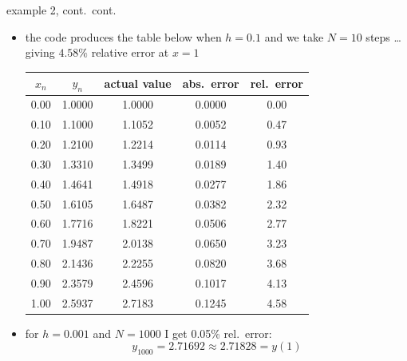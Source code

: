 \documentclass{beamer}
\begin{document}
\begin{frame}{example 2, cont.~cont.}

\begin{itemize}
\item the code produces the table below when $h=0.1$ and we take $N=10$ steps \dots giving $4.58\%$ relative error at $x=1$

\medskip
\footnotesize
\begin{tabular}{ccccc}
$x_n$ & $y_n$ & actual value & abs.~error & rel.~error \\ \hline
0.00 & 1.0000 & 1.0000 & 0.0000 & 0.00 \\
0.10 & 1.1000 & 1.1052 & 0.0052 & 0.47 \\
0.20 & 1.2100 & 1.2214 & 0.0114 & 0.93 \\
0.30 & 1.3310 & 1.3499 & 0.0189 & 1.40 \\
0.40 & 1.4641 & 1.4918 & 0.0277 & 1.86 \\
0.50 & 1.6105 & 1.6487 & 0.0382 & 2.32 \\
0.60 & 1.7716 & 1.8221 & 0.0506 & 2.77 \\
0.70 & 1.9487 & 2.0138 & 0.0650 & 3.23 \\
0.80 & 2.1436 & 2.2255 & 0.0820 & 3.68 \\
0.90 & 2.3579 & 2.4596 & 0.1017 & 4.13 \\
1.00 & 2.5937 & 2.7183 & 0.1245 & 4.58
\end{tabular}

\normalsize
\medskip
\item for $h=0.001$ and $N=1000$ I get 0.05\% rel.~error:
   $$y_{1000} = 2.71692 \approx 2.71828 = y(1)$$
\end{itemize}
\end{frame}
\end{document}
